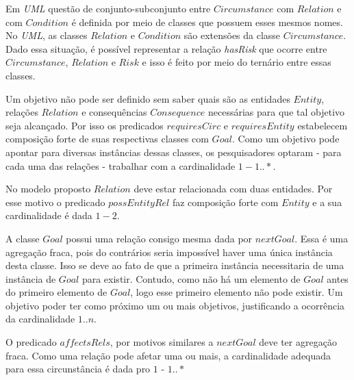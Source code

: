 Em \textit{UML} questão de conjunto-subconjunto entre $Circumstance$ com $Relation$ e com $Condition$ é definida por meio de classes que possuem esses mesmos nomes. No \textit{UML}, as classes $Relation$ e $Condition$ são extensões da classe $Circumstance$. Dado essa situação, é possível representar a relação \textit{hasRisk} que ocorre entre $Circumstance$, $Relation$ e $Risk$ e isso é feito por meio do ternário entre essas classes. 

Um objetivo não pode ser definido sem saber quais são as entidades $Entity$, relações $Relation$ e consequências $Consequence$ necessárias para que tal objetivo seja alcançado. Por isso os predicados $requiresCirc$ e $requiresEntity$ estabelecem composição forte de suas respectivas classes com $Goal$. Como um objetivo pode apontar para diversas instâncias dessas classes, os pesquisadores optaram - para cada uma das relações - trabalhar com a cardinalidade 
$1 - 1 .. *$.

No modelo proposto $Relation$ deve estar relacionada com duas entidades. Por esse motivo o predicado $possEntityRel$ faz composição forte com $Entity$ e a sua cardinalidade é dada $1 - 2$. 

A classe $Goal$ possui uma relação consigo mesma dada por $nextGoal$. Essa é uma agregação fraca, pois do contrários seria impossível haver uma única instância desta classe. Isso se deve ao fato de que a primeira instância necessitaria de uma instância de $Goal$ para existir. Contudo, como não há um elemento de $Goal$ antes do primeiro elemento de $Goal$, logo esse primeiro elemento não pode existir. Um objetivo poder ter como próximo um ou mais objetivos, justificando a ocorrência da cardinalidade $1 .. n$. 

O predicado $affectsRels$, por motivos similares a $nextGoal$ deve ter agregação fraca. Como uma relação pode afetar uma ou mais, a cardinalidade adequada para essa circunstância é dada pro $1$ - $1 ..*$